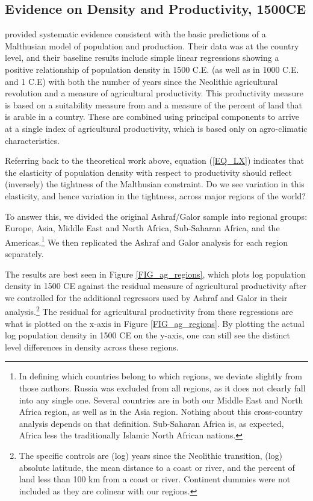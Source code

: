 \documentclass[11pt]{article}
\begin{document}
\subsection{Evidence on Density and Productivity, 1500CE}
\citet{ashraf2010dynamics} provided systematic evidence consistent with the basic predictions of a Malthusian model of population and production. Their data was at the country level, and their baseline results include simple linear regressions showing a positive relationship of population density in 1500 C.E. (as well as in 1000 C.E. and 1 C.E) with both the number of years since the Neolithic agricultural revolution and a measure of agricultural productivity. This productivity measure is based on a suitability measure from \citet{ramankutty2002} and a measure of the percent of land that is arable in a country. These are combined using principal components to arrive at a single index of agricultural productivity, which is based only on agro-climatic characteristics.

Referring back to the theoretical work above, equation (\ref{EQ_LX}) indicates that the elasticity of population density with respect to productivity should reflect (inversely) the tightness of the Malthusian constraint. Do we see variation in this elasticity, and hence variation in the tightness, across major regions of the world?

To answer this, we divided the original Ashraf/Galor sample into regional groups: Europe, Asia, Middle East and North Africa, Sub-Saharan Africa, and the Americas.\footnote{In defining which countries belong to which regions, we deviate slightly from those authors. Russia was excluded from all regions, as it does not clearly fall into any single one. Several countries are in both our Middle East and North Africa region, as well as in the Asia region. Nothing about this cross-country analysis depends on that definition. Sub-Saharan Africa is, as expected, Africa less the traditionally Islamic North African nations.} We then replicated the Ashraf and Galor analysis for each region separately.

The results are best seen in Figure \ref{FIG_ag_regions}, which plots log population density in 1500 CE against the residual measure of agricultural productivity after we controlled for the additional regressors used by Ashraf and Galor in their analysis.\footnote{The specific controls are (log) years since the Neolithic transition, (log) absolute latitude, the mean distance to a coast or river, and the percent of land less than 100 km from a coast or river. Continent dummies were not included as they are colinear with our regions.} The residual for agricultural productivity from these regressions are what is plotted on the x-axis in Figure \ref{FIG_ag_regions}. By plotting the actual log population density in 1500 CE on the y-axis, one can still see the distinct level differences in density across these regions.
\end{document}
